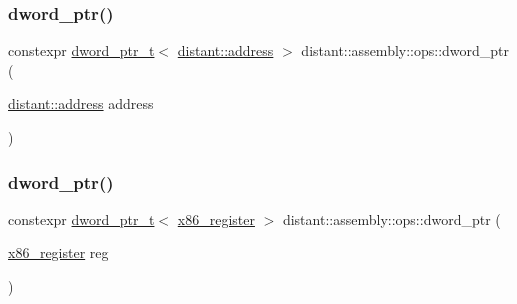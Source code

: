 \subsubsection{\texorpdfstring{dword\+\_\+ptr()}{dword\_ptr()}\hspace{0.1cm}{\footnotesize\ttfamily [1/2]}}
{\footnotesize\ttfamily constexpr \mbox{\hyperlink{structdistant_1_1assembly_1_1dword__ptr__t}{dword\+\_\+ptr\+\_\+t}}$<$ \mbox{\hyperlink{namespacedistant_a9d7aa6e07cb2f50321e29c209f9a7886}{distant\+::address}} $>$ distant\+::assembly\+::ops\+::dword\+\_\+ptr (\begin{DoxyParamCaption}\item[{\mbox{\hyperlink{namespacedistant_a9d7aa6e07cb2f50321e29c209f9a7886}{distant\+::address}}}]{address }\end{DoxyParamCaption})\hspace{0.3cm}{\ttfamily [noexcept]}}

\mbox{\label{namespacedistant_1_1assembly_1_1ops_a0ddaf5bfcaf30283e0a30381824ab998}} 
\subsubsection{\texorpdfstring{dword\+\_\+ptr()}{dword\_ptr()}\hspace{0.1cm}{\footnotesize\ttfamily [2/2]}}
{\footnotesize\ttfamily constexpr \mbox{\hyperlink{structdistant_1_1assembly_1_1dword__ptr__t}{dword\+\_\+ptr\+\_\+t}}$<$ \mbox{\hyperlink{namespacedistant_1_1assembly_a873d3faa0111fc5605de36beaaaafb3e}{x86\+\_\+register}} $>$ distant\+::assembly\+::ops\+::dword\+\_\+ptr (\begin{DoxyParamCaption}\item[{\mbox{\hyperlink{namespacedistant_1_1assembly_a873d3faa0111fc5605de36beaaaafb3e}{x86\+\_\+register}}}]{reg }\end{DoxyParamCaption})\hspace{0.3cm}{\ttfamily [noexcept]}}

\mbox{\label{namespacedistant_1_1assembly_1_1ops_a5814220499f0f72f62540fb7ae5570ac}} 
